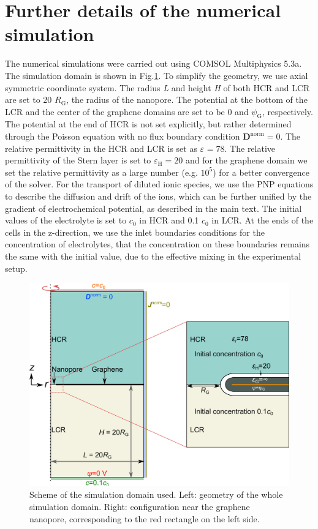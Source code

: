 \documentclass[manuscript=suppinfo,email=true, hyperref=true, keywords=false]{achemso}
\newcommand{\Fig}{Fig.}
\begin{document}
\section{Further details of the numerical simulation }
\label{sec:numer}

The numerical simulations were carried out using COMSOL Multiphysics
5.3a. The simulation domain is shown in \Fig \ref{fig:scheme}. To
simplify the geometry, we use axial symmetric coordinate system. The
radius \textit{L} and height \textit{H} of both HCR and LCR are set to
20 $R_{\mathrm{G}}$, the radius of the nanopore. The potential at the
bottom of the LCR and the center of the graphene domains are set to be
0 and $\psi_{\mathrm{G}}$, respectively. The potential at the end of
HCR is not set explicitly, but rather determined through the Poisson
equation with no flux boundary condition
$\boldsymbol{D}^{\mathrm{norm}}=0$. The relative permittivity in the
HCR and LCR is set as $\varepsilon_{\mathrm{}}=78$. The relative
permittivity of the Stern layer is set to
$\varepsilon_{\mathrm{H}}=20$\cite{Conway_1951} and for the graphene
domain we set the relative permittivity as a large number
(e.g. $10^{5}$) for a better convergence of the solver.  For the
transport of diluted ionic species, we use the PNP equations to
describe the diffusion and drift of the ions, which can be further
unified by the gradient of electrochemical potential, as described in
the main text. The initial values of the electrolyte is set to $c_{0}$
in HCR and 0.1 $c_{0}$ in LCR. At the ends of the cells in the
z-direction, we use the inlet boundaries conditions for the
concentration of electrolytes, that the concentration on these
boundaries remains the same with the initial value, due to the
effective mixing in the experimental setup.

\begin{figure}[htbp]
  \centering
  \includegraphics[width=0.8\linewidth]{img/SI-numerical-1.png}
  \caption{Scheme of the simulation domain used. Left: geometry of the
    whole simulation domain. Right: configuration near the graphene
    nanopore, corresponding to the red rectangle on the left side.}
  \label{fig:scheme}
\end{figure}
\end{document}
